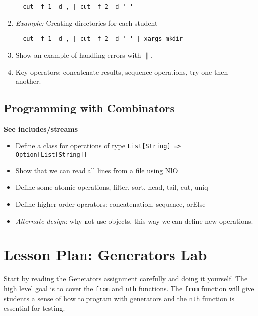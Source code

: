 \documentclass[9pt]{extbook}
\begin{document}
\begin{enumerate}
  \begin{lstlisting}
  cut -f 1 -d , | cut -f 2 -d ' '
  \end{lstlisting}

  
  \item \emph{Example:} Creating directories for each student

  \begin{lstlisting}
  cut -f 1 -d , | cut -f 2 -d ' ' | xargs mkdir
  \end{lstlisting}

  \item Show an example of handling errors with $\|$.

  \item Key operators: concatenate results, sequence operations, try one then
  another.

\end{enumerate}

\section{Programming with Combinators}

\textbf{See includes/streams}

\begin{itemize}

  \item Define a class for operations of type \lstinline|List[String] => Option[List[String]]|

  \item Show that we can read all lines from a file using NIO

  \item Define some atomic operations, filter, sort, head, tail, cut, uniq

  \item Define higher-order operators: concatenation, sequence, orElse

  \item \emph{Alternate design}: why not use objects, this way we can define
  new operations.

\end{itemize}

\chapter{Lesson Plan: Generators Lab}

Start by reading the Generators assignment carefully and doing it yourself.
The high level goal is to cover the \lstinline|from| and \lstinline|nth|
functions. The \lstinline|from| function will give students a sense of how
to program with generators and the \lstinline|nth| function is essential
for testing.
\end{document}
